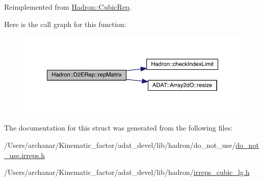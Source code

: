 Reimplemented from \mbox{\hyperlink{structHadron_1_1CubicRep_ac5d7e9e6f4ab1158b5fce3e4ad9e8005}{Hadron\+::\+Cubic\+Rep}}.

Here is the call graph for this function\+:
\nopagebreak
\begin{figure}[H]
\begin{center}
\leavevmode
\includegraphics[width=350pt]{d4/d82/structHadron_1_1D2ERep_a0d6937e2a9cf2e22df238b7e3eafbf8e_cgraph}
\end{center}
\end{figure}


The documentation for this struct was generated from the following files\+:\begin{DoxyCompactItemize}
\item 
/\+Users/archanar/\+Kinematic\+\_\+factor/adat\+\_\+devel/lib/hadron/do\+\_\+not\+\_\+use/\mbox{\hyperlink{do__not__use_8irreps_8h}{do\+\_\+not\+\_\+use.\+irreps.\+h}}\item 
/\+Users/archanar/\+Kinematic\+\_\+factor/adat\+\_\+devel/lib/hadron/\mbox{\hyperlink{lib_2hadron_2irreps__cubic__lg_8h}{irreps\+\_\+cubic\+\_\+lg.\+h}}\end{DoxyCompactItemize}
